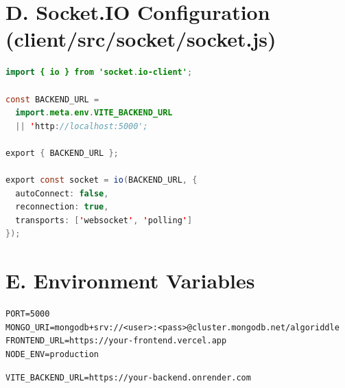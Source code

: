 \documentclass[12pt,a4paper,oneside]{report}
\begin{document}
\section*{D. Socket.IO Configuration (client/src/socket/socket.js)}

\begin{lstlisting}[language=Java, caption={Client-Side Socket.IO Configuration}]
import { io } from 'socket.io-client';

const BACKEND_URL =
  import.meta.env.VITE_BACKEND_URL
  || 'http://localhost:5000';

export { BACKEND_URL };

export const socket = io(BACKEND_URL, {
  autoConnect: false,
  reconnection: true,
  transports: ['websocket', 'polling']
});
\end{lstlisting}

\section*{E. Environment Variables}

\begin{lstlisting}[language={}, caption={Server Environment Variables (.env)}]
PORT=5000
MONGO_URI=mongodb+srv://<user>:<pass>@cluster.mongodb.net/algoriddle
FRONTEND_URL=https://your-frontend.vercel.app
NODE_ENV=production
\end{lstlisting}

\begin{lstlisting}[language={}, caption={Client Environment Variables (.env)}]
VITE_BACKEND_URL=https://your-backend.onrender.com
\end{lstlisting}

\end{document}
